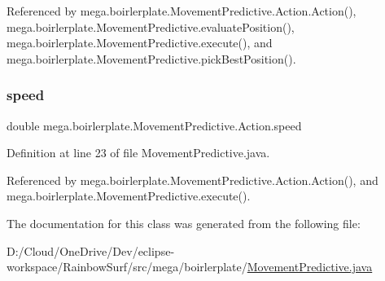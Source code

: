 Referenced by mega.\+boirlerplate.\+Movement\+Predictive.\+Action.\+Action(), mega.\+boirlerplate.\+Movement\+Predictive.\+evaluate\+Position(), mega.\+boirlerplate.\+Movement\+Predictive.\+execute(), and mega.\+boirlerplate.\+Movement\+Predictive.\+pick\+Best\+Position().

\mbox{\label{classmega_1_1boirlerplate_1_1_movement_predictive_1_1_action_ad107aff2bd797bfa3991eb36e6a5ad83}} 
\subsubsection{\texorpdfstring{speed}{speed}}
{\footnotesize\ttfamily double mega.\+boirlerplate.\+Movement\+Predictive.\+Action.\+speed}



Definition at line 23 of file Movement\+Predictive.\+java.



Referenced by mega.\+boirlerplate.\+Movement\+Predictive.\+Action.\+Action(), and mega.\+boirlerplate.\+Movement\+Predictive.\+execute().



The documentation for this class was generated from the following file\+:\begin{DoxyCompactItemize}
\item 
D\+:/\+Cloud/\+One\+Drive/\+Dev/eclipse-\/workspace/\+Rainbow\+Surf/src/mega/boirlerplate/\hyperlink{_movement_predictive_8java}{Movement\+Predictive.\+java}\end{DoxyCompactItemize}
